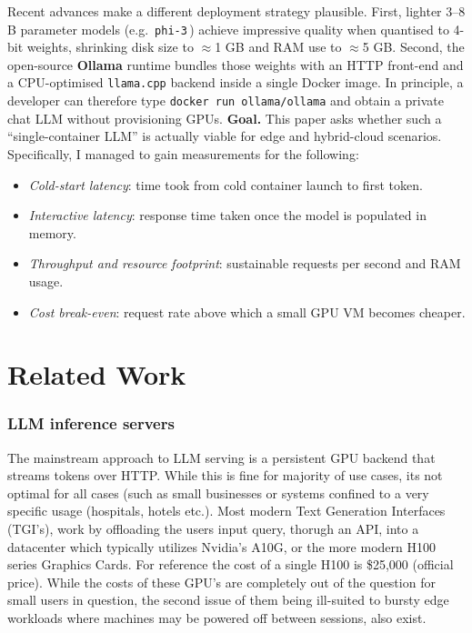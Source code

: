 \documentclass[conference]{IEEEtran}
\begin{document}
Recent advances make a different deployment strategy plausible.  
First, lighter 3–8 B parameter models (e.g.\ \texttt{phi-3}\,\cite{phi3}) achieve impressive quality when quantised to 4-bit weights, shrinking disk size to \(\approx\)1 GB and RAM use to \(\approx\)5 GB.  
Second, the open-source \textbf{Ollama} runtime bundles those weights with an HTTP front-end and a CPU-optimised \texttt{llama.cpp} backend inside a single Docker image.  
In principle, a developer can therefore type \texttt{docker run ollama/ollama} and obtain a private chat LLM without provisioning GPUs.
\vspace{0.3em}
\noindent\textbf{Goal.}  
This paper asks whether such a “single-container LLM” is actually viable for edge and hybrid-cloud scenarios.  
Specifically, I managed to gain measurements for the following:

\begin{itemize}
  \item \textit{Cold-start latency}: time took from cold container launch to first token.
  \item \textit{Interactive latency}: response time taken once the model is populated in memory.
  \item \textit{Throughput and resource footprint}: sustainable requests per second and RAM usage.
  \item \textit{Cost break-even}: request rate above which a small GPU VM becomes cheaper.
\end{itemize}


\section{Related Work}\label{sec:related}
\subsubsection*{LLM inference servers}
The mainstream approach to LLM serving is a persistent GPU backend that streams tokens over HTTP. While this is fine for majority of use cases, its not optimal for all cases (such as small businesses or systems confined to a very specific usage (hospitals, hotels etc.). Most modern Text Generation Interfaces (TGI's), work by offloading the users input query, thorugh an API, into a datacenter which typically utilizes Nvidia's A10G, or the more modern H100 series Graphics Cards. For reference the cost of a single H100 is \$25,000 (official price). While the costs of these GPU's are completely out of the question for small users in question, the second issue of them being ill-suited to bursty edge workloads where machines may be powered off between sessions, also exist.
\end{document}
